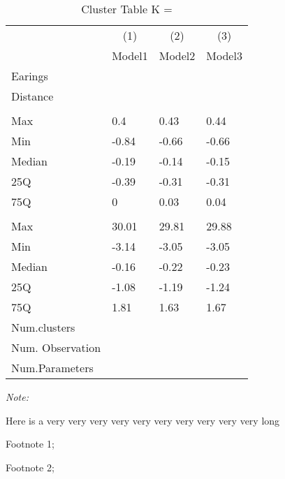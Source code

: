 \begin{table}
\centering
\caption{Cluster Table K = }
\centering
\begin{threeparttable}
\begin{tabular}[t]{llll}
\toprule
\multicolumn{1}{c}{ } & \multicolumn{1}{c}{(1)} & \multicolumn{1}{c}{(2)} & \multicolumn{1}{c}{(3)} \\
\cmidrule(l{3pt}r{3pt}){2-2} \cmidrule(l{3pt}r{3pt}){3-3} \cmidrule(l{3pt}r{3pt}){4-4}
 & Model1 & Model2 & Model3\\
\midrule
Earings &  &  & \\
Distance &  &  & \\
\addlinespace[0.3em]
\multicolumn{4}{l}{\textbf{Panel A: }}\\
\hspace{1em}Max & 0.4 & 0.43 & 0.44\\
\hspace{1em}Min & -0.84 & -0.66 & -0.66\\
\hspace{1em}Median & -0.19 & -0.14 & -0.15\\
\hspace{1em}25Q & -0.39 & -0.31 & -0.31\\
\hspace{1em}75Q & 0 & 0.03 & 0.04\\
\addlinespace[0.3em]
\multicolumn{4}{l}{\textbf{Panel B: }}\\
\hspace{1em}Max & 30.01 & 29.81 & 29.88\\
\hspace{1em}Min & -3.14 & -3.05 & -3.05\\
\hspace{1em}Median & -0.16 & -0.22 & -0.23\\
\hspace{1em}25Q & -1.08 & -1.19 & -1.24\\
\hspace{1em}75Q & 1.81 & 1.63 & 1.67\\
Num.clusters &  &  & \\
Num. Observation &  &  & \\
Num.Parameters &  &  & \\
\bottomrule
\end{tabular}
\begin{tablenotes}
\item \textit{Note: } 
\item Here is a very very very very very very very very very very long
\item[1] Footnote 1; 
\item[2] Footnote 2; 
\end{tablenotes}
\end{threeparttable}
\end{table}
